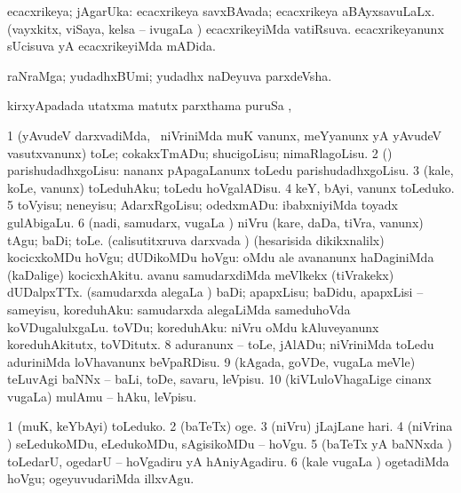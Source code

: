 {\bentry
{} 
\gl{\gu}
\bmng
ecacxrikeya; jAgarUka: 
\banum
{} ecacxrikeya savxBAvada; ecacxrikeya aBAyxsavuLaLx. 
 (vayxkitx, viSaya, kelsa -- ivugaLa \vi) ecacxrikeyiMda vatiRsuva. 
 ecacxrikeyanunx sUcisuva yA ecacxrikeyiMda mADida. 
\eanum
\emng
\eentry

\bentry
{} 
\gl{\nA}
\expl{}
\bmng
raNraMga; yudadhxBUmi; yudadhx naDeyuva parxdeVsha. 
\emng
\eentry

\bentry
{} 
\gl{\kirx}
\expl{}
\bmng
{} kirxyApadada utatxma matutx parxthama puruSa \Eva, \udA\  
\emng
\eentry

\bentry
{} 
\gl{\sakirx}
\expl{}
\bmng
\bnum
\num{1} (yAvudeV darxvadiMda, \kanmu\ niVriniMda muK \mo vanunx, meYyanunx yA yAvudeV vasutxvanunx) toLe; cokakxTmADu; shucigoLisu; nimaRlagoLisu. 
\num{2} (\rUpa) parishudadhxgoLisu:  nananx pApagaLanunx toLedu parishudadhxgoLisu. 
\num{3} (kale, koLe, \mo vanunx) toLeduhAku; toLedu hoVgalADisu. 
\num{4} keY, bAyi, \mo vanunx toLeduko. 
\num{5} toVyisu; neneyisu; AdarxRgoLisu; odedxmADu:  ibabxniyiMda toyadx gulAbigaLu. 
\num{6} (nadi, samudarx, \mo vugaLa \vi) niVru (kare, daDa, tiVra, \mo vanunx) tAgu; baDi; toLe. 
\banum
{} (calisutitxruva darxvada \vi) (hesarisida dikikxnalilx) kocicxkoMDu hoVgu; dUDikoMDu hoVgu:  oMdu ale avananunx haDaginiMda (kaDalige) kocicxhAkitu.  avanu samudarxdiMda meVlkekx (tiVrakekx) dUDalpxTTx. 
 (samudarxda alegaLa \vi) baDi; apapxLisu; baDidu, apapxLisi -- sameyisu, koreduhAku:  samudarxda alegaLiMda sameduhoVda koVDugalulxgaLu. 
 toVDu; koreduhAku:  niVru oMdu kAluveyanunx koreduhAkitutx, toVDitutx. 
\eanum
\numie
\num{8} aduranunx -- toLe, jAlADu; niVriniMda toLedu aduriniMda loVhavanunx beVpaRDisu. 
\num{9} (kAgada, goVDe, \mo vugaLa meVle) teLuvAgi baNNx -- baLi, toDe, savaru, leVpisu. 
\num{10} (kiVLuloVhagaLige cinanx \mo vugaLa) mulAmu -- hAku, leVpisu. 
\enum
\emng

\noindent 
\gl{\akirx}
\expl{}
\bmng
\bnum
\num{1} (muK, keYbAyi) toLeduko. 
\num{2} (baTeTx) oge. 
\num{3} (niVru) jLajLane hari. 
\num{4} (niVrina \vi) seLedukoMDu, eLedukoMDu, sAgisikoMDu -- hoVgu. 
\num{5} (baTeTx yA baNNxda \vi) toLedarU, ogedarU -- hoVgadiru yA hAniyAgadiru. 
\num{6} (kale \mo vugaLa \vi) ogetadiMda hoVgu; ogeyuvudariMda illxvAgu. 
\enum
\emng

}
